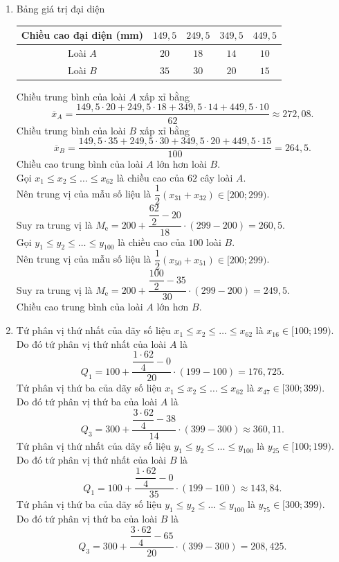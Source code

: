 \begin{ex}
{\begin{enumerate}
			\item Bảng giá trị đại  diện
			\begin{center}
				\begin{tabular}{|c|c|c|c|c|}
					\hline Chiều cao đại diện (mm) & $149{,}5$ & $249{,}5$ &  $349{,}5$ & $449{,}5$ \\
					\hline Loài  $A$ & $20$ & $18$ & $14$ & $10$ \\
					 \hline Loài $B$ & $35$ & $30$ & $20$ & $15$ \\
					\hline 
				\end{tabular}
			\end{center}
			Chiều trung bình của loài $A$ xấp xỉ  bằng
			 \[
			\overline x_A 
			= \dfrac{149{,}5 \cdot 20 + 249{,}5 \cdot 18 + 349{,}5 \cdot 14 +  449{,}5 \cdot 10}{62}
			\approx  272{,}08.
			 \]
			Chiều trung bình của loài $B$ xấp  xỉ bằng
			\[ 
			\overline  x_B
			=\dfrac{149{,}5 \cdot 35 +  249{,}5 \cdot 30 + 349{,}5 \cdot 20 + 449{,}5 \cdot 15}{100}
			 = 264{,}5.
			\] 
			Chiều cao trung bình của loài $A$ lớn hơn loài $B$. 
			 \\
			Gọi $x_1 \leq x_2 \leq \ldots \leq x_{62}$ là chiều  cao của $62$ cây loài $A$.
			 \\
			Nên trung  vị của mẫu số liệu là $\dfrac{1}{2}\left(x_{31}+x_{32}\right)\in[200; 299)$.
			\\ 
			Suy ra trung vị là $M_{\mathrm{e}}=200+\dfrac{\dfrac{62}{2}-20}{18} \cdot  (299-200)=260{,}5$.
			 \\
			 Gọi $y_1 \leq y_2 \leq \ldots \leq y_{100}$ là chiều cao của $100$ loài $B$.
			\\ 
			Nên trung vị của mẫu số liệu là $\dfrac{1}{2}\left(x_{50}+x_{51}\right) \in[200;  299)$.
			 \\
			Suy ra trung vị là $M_{\mathrm{e}} =  200+\dfrac{\dfrac{100}{2}-35}{30} \cdot (299-200)=249{,}5$.
			\\ 
			Chiều cao trung bình của  loài $A$ lớn hơn $B$.
			\item Tứ phân vị thứ nhất của dãy số liệu  $x_1 \leq x_2 \leq \ldots \leq x_{62}$ là $x_{16}\in[100; 199)$.
			\\ 
			Do đó tứ phân vị thứ nhất  của loài $A$ là
			\[ 
			Q_1= 100  +\dfrac{\dfrac{1 \cdot 62}{4} -0}{20 } \cdot (199-100)= 176{,}725.
			\] 
			Tứ phân vị thứ ba của dãy số liệu $x_1 \leq x_2 \leq \ldots \leq x_{62}$ là  $x_{47}\in[300; 399)$.
			\\ 
			Do  đó tứ phân vị thứ ba của loài $A$ là
			\[ 
			Q_3 = 300+\dfrac{\dfrac{3 \cdot 62}{4}-38}{14} \cdot (399-300)  \approx 360{,}11.
			\] 
			Tứ phân vị thứ nhất  của dãy số liệu $y_1 \leq y_2 \leq \ldots \leq y_{100}$ là $y_{25}\in[100; 199)$.
			\\ 
			Do đó tứ phân vị thứ nhất của  loài $B$ là
			\[ 
			Q_1=100+\dfrac{\dfrac{1 \cdot 62}{4}-0}{35} \cdot (199-100)  \approx 143{,}84.
			\] 
			Tứ phân vị thứ ba của dãy số liệu $y_1 \leq y_2 \leq \ldots \leq y_{100}$ là $y_{75}\in[300; 399)$. 
			 \\
			 Do đó tứ phân vị thứ ba của loài $B$ là
			 \[
			Q_3=300+\dfrac{\dfrac{3 \cdot 62}{4}-65}{20} \cdot (399-300)=208{,}425. 
			\] 
		\end{enumerate}
	 }
\end{ex}

